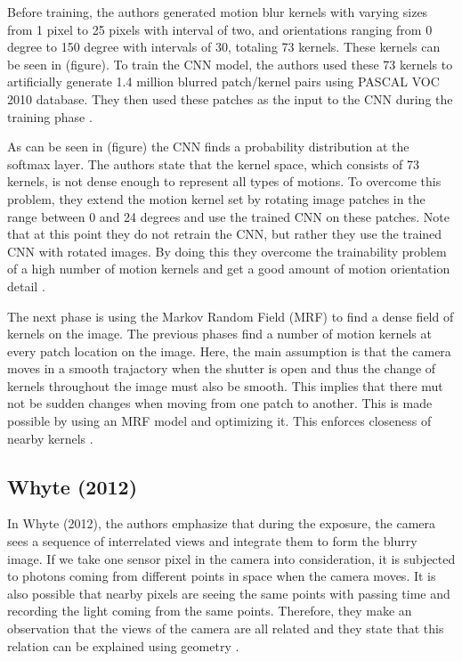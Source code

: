 \documentclass[10pt,twocolumn,letterpaper]{article}
\begin{document}
Before training, the authors generated motion blur kernels with varying sizes from 1 pixel to 25 pixels with interval of two, and orientations ranging from 0 degree to 150 degree with intervals of 30, totaling 73 kernels. These kernels can be seen in (figure). To train the CNN model, the authors used these 73 kernels to artificially generate 1.4 million blurred patch/kernel pairs using PASCAL VOC 2010 database. They then used these patches as the input to the CNN during the training phase \cite{sun2015learning}.

As can be seen in (figure) the CNN finds a probability distribution at the softmax layer. The authors state that the kernel space, which consists of 73 kernels, is not dense enough to represent all types of motions. To overcome this problem, they extend the motion kernel set by rotating image patches in the range between 0 and 24 degrees and use the trained CNN on these patches. Note that at this point they do not retrain the CNN, but rather they use the trained CNN with rotated images. By doing this they overcome the trainability problem of a high number of motion kernels and get a good amount of motion orientation detail \cite{sun2015learning}.

The next phase is using the Markov Random Field (MRF) to find a dense field of kernels on the image. The previous phases find a number of motion kernels at every patch location on the image. Here, the main assumption is that the camera moves in a smooth trajactory when the shutter is open and thus the change of kernels throughout the image must also be smooth. This implies that there mut not be sudden changes when moving from one patch to another. This is made possible by using an MRF model and optimizing it. This enforces closeness of nearby kernels \cite{sun2015learning}.

\subsection{Whyte \textbf{\etal} (2012)}

In Whyte \etal (2012), the authors emphasize that during the exposure, the camera sees a sequence of interrelated views and integrate them to form the blurry image. If we take one sensor pixel in the camera into consideration, it is subjected to photons coming from different points in space when the camera moves. It is also possible that nearby pixels are seeing the same points with passing time and recording the light coming from the same points. Therefore, they make an observation that the views of the camera are all related and they state that this relation can be explained using geometry \cite{whyte2012non}.
\end{document}
